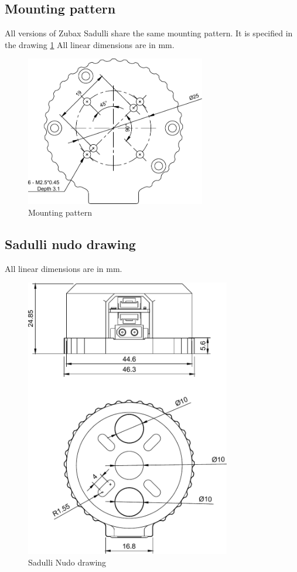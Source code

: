 \subsection{Mounting pattern}

All versions of Zubax Sadulli share the same mounting pattern. 
It is specified in the drawing \ref{mounting_pattern} All linear dimensions are in mm.

\begin{figure}[!hbt]
    \centerline{\includegraphics[width=0.7\textwidth]{figures/mounting_pattern}}
    \caption{Mounting pattern\label{mounting_pattern}}
\end{figure}

\newpage

\subsection{Sadulli nudo drawing}
All linear dimensions are in mm.

\begin{figure}[!hbt]
    \centerline{\includegraphics[width=0.8\textwidth]{figures/sadulli_nudo}}
    \caption{Sadulli Nudo drawing\label{Nudo_drawing}}
\end{figure}

